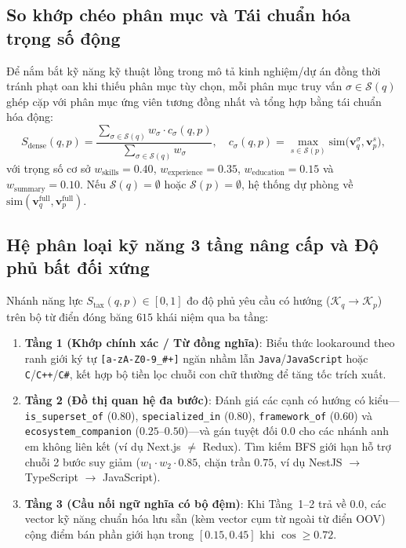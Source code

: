 \subsection{So khớp chéo phân mục và Tái chuẩn hóa trọng số động}
Để nắm bắt kỹ năng kỹ thuật lồng trong mô tả kinh nghiệm/dự án đồng thời tránh phạt oan khi thiếu phân mục tùy chọn, mỗi phân mục truy vấn $\sigma \in \mathcal{S}(q)$ ghép cặp với phân mục ứng viên tương đồng nhất và tổng hợp bằng tái chuẩn hóa động:
\begin{equation}
    S_{\text{dense}}(q, p) = \frac{\sum_{\sigma \in \mathcal{S}(q)} w_\sigma \cdot c_\sigma(q, p)}{\sum_{\sigma \in \mathcal{S}(q)} w_\sigma}, \quad c_\sigma(q, p) = \max_{s \in \mathcal{S}(p)} \text{sim}\big(\mathbf{v}_q^\sigma, \mathbf{v}_p^s\big),
    \label{eq:cross_dynamic}
\end{equation}
với trọng số cơ sở $w_{\text{skills}} = 0.40$, $w_{\text{experience}} = 0.35$, $w_{\text{education}} = 0.15$ và $w_{\text{summary}} = 0.10$. Nếu $\mathcal{S}(q) = \emptyset$ hoặc $\mathcal{S}(p) = \emptyset$, hệ thống dự phòng về $\text{sim}(\mathbf{v}_q^{\text{full}}, \mathbf{v}_p^{\text{full}})$.

\subsection{Hệ phân loại kỹ năng 3 tầng nâng cấp và Độ phủ bất đối xứng}
Nhánh năng lực $S_{\text{tax}}(q, p) \in [0, 1]$ đo độ phủ yêu cầu có hướng ($\mathcal{K}_q \rightarrow \mathcal{K}_p$) trên bộ từ điển đóng băng $615$ khái niệm qua ba tầng:
\begin{enumerate}
    \item \textbf{Tầng 1 (Khớp chính xác / Từ đồng nghĩa)}: Biểu thức lookaround theo ranh giới ký tự \texttt{[a-zA-Z0-9\_\#+]} ngăn nhầm lẫn \texttt{Java}/\texttt{JavaScript} hoặc \texttt{C}/\texttt{C++}/\texttt{C\#}, kết hợp bộ tiền lọc chuỗi con chữ thường để tăng tốc trích xuất.
    \item \textbf{Tầng 2 (Đồ thị quan hệ đa bước)}: Đánh giá các cạnh có hướng có kiểu---\texttt{is\_superset\_of} ($0.80$), \texttt{specialized\_in} ($0.80$), \texttt{framework\_of} ($0.60$) và \texttt{ecosystem\_companion} ($0.25$--$0.50$)---và gán tuyệt đối $0.0$ cho các nhánh anh em không liên kết (ví dụ Next.js $\neq$ Redux). Tìm kiếm BFS giới hạn hỗ trợ chuỗi 2 bước suy giảm ($w_1 \cdot w_2 \cdot 0.85$, chặn trần $0.75$, ví dụ NestJS $\rightarrow$ TypeScript $\rightarrow$ JavaScript).
    \item \textbf{Tầng 3 (Cầu nối ngữ nghĩa có bộ đệm)}: Khi Tầng~1--2 trả về $0.0$, các vector kỹ năng chuẩn hóa lưu sẵn (kèm vector cụm từ ngoài từ điển OOV) cộng điểm bán phần giới hạn trong $[0.15, 0.45]$ khi $\cos \ge 0.72$.
\end{enumerate}

